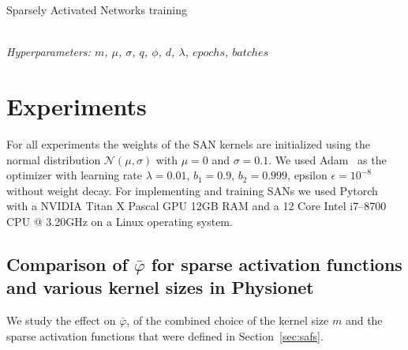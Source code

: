 \documentclass[journal]{IEEEtran}
\begin{document}
\begin{algorithm}[H]
  \caption{Sparsely Activated Networks training}\label{alg:training}
  \begin{algorithmic}[1]
    \renewcommand{\algorithmicrequire}{\textbf{Input:}}
    \renewcommand{\algorithmicensure}{\textbf{Output:}}
    \\ \textit{Hyperparameters:  $m$, $\mu$, $\sigma$, $q$, $\phi$, $d$, $\lambda$, $epochs$, $batches$}
    \ENDFOR{}
    \ENDFOR{}
    \ENDFOR{}
    \ENDFOR{}
  \end{algorithmic}
\end{algorithm}

\section{Experiments}\label{sec:experiments}
For all experiments the weights of the SAN kernels are initialized using the normal distribution $\mathcal{N}(\mu, \sigma)$ with $\mu=0$ and $\sigma=0.1$.
We used Adam~\cite{kingma2014adam} as the optimizer with learning rate $\lambda=0.01$, $b_1=0.9$, $b_2=0.999$, epsilon $\epsilon=10^{-8}$ without weight decay.
For implementing and training SANs we used Pytorch~\cite{paszke2017automatic} with a NVIDIA Titan X Pascal GPU 12GB RAM and a 12 Core Intel i7--8700 CPU @ 3.20GHz on a Linux operating system.

\subsection{Comparison of $\bar\varphi$ for sparse activation functions and various kernel sizes in Physionet}
We study the effect on $\bar\varphi$, of the combined choice of the kernel size $m$ and the sparse activation functions that were defined in Section~\ref{sec:safs}.
\end{document}

